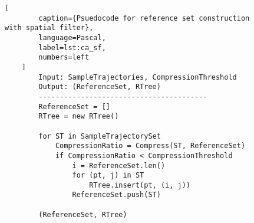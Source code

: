 \begin{figure}
    \begin{lstlisting}[
        caption={Psuedocode for reference set construction with spatial filter},
        language=Pascal,
        label=lst:ca_sf,
        numbers=left
    ]
        Input: SampleTrajectories, CompressionThreshold
        Output: (ReferenceSet, RTree)
        ----------------------------------------
        ReferenceSet = []
        RTree = new RTree()

        for ST in SampleTrajectorySet
            CompressionRatio = Compress(ST, ReferenceSet)
            if CompressionRatio < CompressionThreshold 
                i = ReferenceSet.len()
                for (pt, j) in ST
                    RTree.insert(pt, (i, j))
                ReferenceSet.push(ST)

        (ReferenceSet, RTree)
    \end{lstlisting}
\end{figure}